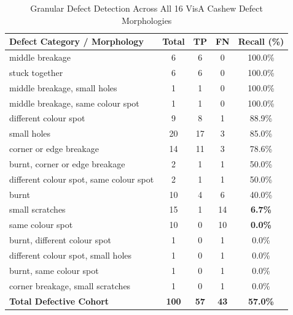 \begin{table}[t]
\centering
\caption{Granular Defect Detection Across All 16 VisA Cashew Defect Morphologies}
\label{tab:morphology_breakdown}
\begin{tabular}{lcccc}
\toprule
\textbf{Defect Category / Morphology} & \textbf{Total} & \textbf{TP} & \textbf{FN} & \textbf{Recall (\%)} \\
\midrule
middle breakage & 6 & 6 & 0 & 100.0\% \\
stuck together & 6 & 6 & 0 & 100.0\% \\
middle breakage, small holes & 1 & 1 & 0 & 100.0\% \\
middle breakage, same colour spot & 1 & 1 & 0 & 100.0\% \\
different colour spot & 9 & 8 & 1 & 88.9\% \\
small holes & 20 & 17 & 3 & 85.0\% \\
corner or edge breakage & 14 & 11 & 3 & 78.6\% \\
burnt, corner or edge breakage & 2 & 1 & 1 & 50.0\% \\
different colour spot, same colour spot & 2 & 1 & 1 & 50.0\% \\
burnt & 10 & 4 & 6 & 40.0\% \\
small scratches & 15 & 1 & 14 & \textbf{6.7\%} \\
same colour spot & 10 & 0 & 10 & \textbf{0.0\%} \\
burnt, different colour spot & 1 & 0 & 1 & 0.0\% \\
different colour spot, small holes & 1 & 0 & 1 & 0.0\% \\
burnt, same colour spot & 1 & 0 & 1 & 0.0\% \\
corner breakage, small scratches & 1 & 0 & 1 & 0.0\% \\
\midrule
\textbf{Total Defective Cohort} & \textbf{100} & \textbf{57} & \textbf{43} & \textbf{57.0\%} \\
\bottomrule
\end{tabular}
\end{table}
